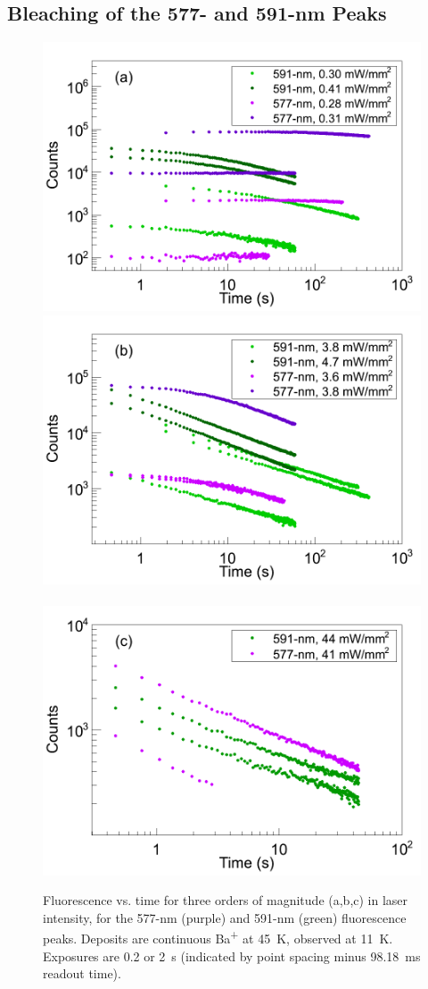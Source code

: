 \subsection{Bleaching of the 577- and 591-nm Peaks}
\label{sec:bleach577and591}

\begin{figure} %
        \centering
                \includegraphics[width=.5\textwidth]{figures/bleach_577vs591_on-res_a_low-I.png}
                \includegraphics[width=.5\textwidth]{figures/bleach_577vs591_on-res_b_medium-I.png}
                ~
                \includegraphics[width=.5\textwidth]{figures/bleach_577vs591_on-res_c_high-I.png}
                \caption{Fluorescence vs. time for three orders of magnitude (a,b,c) in laser intensity, for the 577-nm (purple) and 591-nm (green) fluorescence peaks.  Deposits are continuous Ba\textsuperscript{+} at 45~K, observed at 11~K.  Exposures are 0.2 or 2~s (indicated by point spacing minus 98.18~ms readout time).}
\label{fig:bleach_577vs591}
\end{figure}

